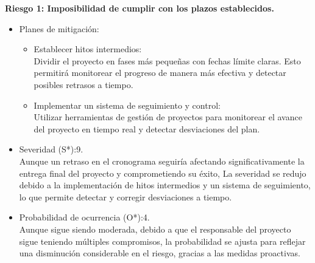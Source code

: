 \textbf{Riesgo 1: Imposibilidad de cumplir con los plazos establecidos.}
\begin{itemize}
	\item Planes de mitigación:\\
	      \begin{itemize}
		      \item Establecer hitos intermedios:\\ Dividir el proyecto en fases más pequeñas con
		            fechas límite claras. Esto permitirá monitorear el progreso de manera más
		            efectiva y detectar posibles retrasos a tiempo.
		      \item Implementar un sistema de seguimiento y control:\\ Utilizar herramientas de
		            gestión de proyectos para monitorear el avance del proyecto en tiempo real y
		            detectar desviaciones del plan.
	      \end{itemize}
	\item Severidad (S*):9.\\ Aunque un retraso en el cronograma seguiría afectando
	      significativamente la entrega final del proyecto y comprometiendo su éxito, La
	      severidad se redujo debido a la implementación de hitos intermedios y un
	      sistema de seguimiento, lo que permite detectar y corregir desviaciones a
	      tiempo.
	\item Probabilidad de ocurrencia (O*):4.\\ Aunque sigue siendo moderada, debido a que
	      el responsable del proyecto sigue teniendo múltiples compromisos, la
	      probabilidad se ajusta para reflejar una disminución considerable en el riesgo,
	      gracias a las medidas proactivas.
\end{itemize}

\pagebreak

